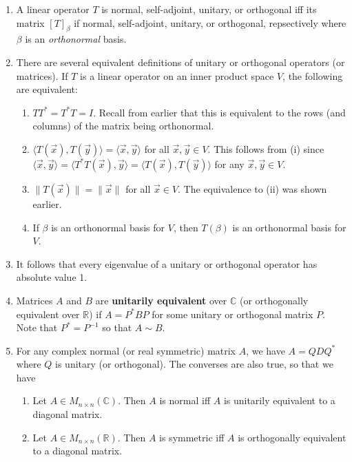 \documentclass[10pt]{article}
\begin{document}
\begin{multicols*}{2}
\begin{enumerate}
\begin{enumerate}
        \item A linear operator $T$ is normal, self-adjoint, unitary, or orthogonal iff its matrix $[T]_\beta$ if normal, self-adjoint, unitary, or orthogonal, repsectively where $\beta$ is an \textit{orthonormal} basis.
        
        \item There are several equivalent definitions of unitary or orthogonal operators (or matrices). If $T$ is a linear operator on an inner product space $V$, the following are equivalent:
        \begin{enumerate}
            \item $TT^* = T^*T = I$. Recall from earlier that this is equivalent to the rows (and columns) of the matrix being orthonormal.
            \item $\langle T(\vec{x}), T(\vec{y}) \rangle = \langle \vec{x}, \vec{y} \rangle$ for all $\vec{x}, \vec{y} \in V$. This follows from (i) since $\langle \vec{x}, \vec{y} \rangle = \langle T^*T(\vec{x}), \vec{y} \rangle = \langle T(\vec{x}), T(\vec{y}) \rangle$ for any $\vec{x}, \vec{y} \in V$.
            \item $\| T(\vec{x}) \| = \| \vec{x} \|$ for all $\vec{x} \in V$. The equivalence to (ii) was shown earlier.
            \item If $\beta$ is an orthonormal basis for $V$, then $T(\beta)$ is an orthonormal basis for $V$.
        \end{enumerate}
        \item It follows that every eigenvalue of a unitary or orthogonal operator has absolute value 1.
        \item Matrices $A$ and $B$ are \textbf{unitarily equivalent} over $\mathbb{C}$ (or orthogonally equivalent over $\mathbb{R}$) if $A=P^*BP$ for some unitary or orthogonal matrix $P$. Note that $P^* = P^{-1}$ so that $A \sim B$.
        \item For any complex normal (or real symmetric) matrix $A$, we have $A = QDQ^{*}$ where $Q$ is unitary (or orthogonal). The converses are also true, so that we have
        \begin{enumerate}
            \item Let $A \in M_{n \times n}(\mathbb{C})$. Then $A$ is normal iff $A$ is unitarily equivalent to a diagonal matrix. 
            \item Let $A \in M_{n \times n}(\mathbb{R})$. Then $A$ is symmetric iff $A$ is orthogonally equivalent to a diagonal matrix. 
        \end{enumerate}

\end{enumerate}
\end{enumerate}
\end{multicols*}
\end{document}
